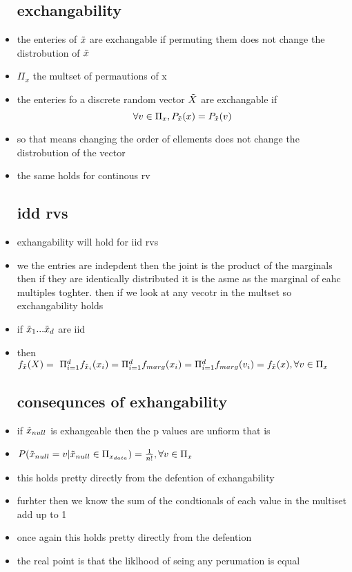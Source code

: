 \documentclass{article}
\begin{document}
\begin{itemize}
\subsection{exchangability}
\item the enteries of $\Tilde{x}$ are exchangable if permuting them does not change the distrobution of $\Tilde{x}$
\item $\Pi_{x}$ the multset of permautions of x 
\item the enteries fo a discrete random vector $\Tilde{X}$ are exchangable if $$\forall v\in \Pi_{x}, P_{\Tilde{x}}(x)=P_{\Tilde{x}}(v)$$
\item so that means changing the order  of ellements does not change the distrobution of the vector
\item the same holds for continous rv
\subsection{idd rvs}
\item exhangability will hold for iid rvs 
\item we the entries are indepdent then the joint is the product of the marginals then if they are identically distributed it is the asme as the marginal of eahc multiples toghter. then if we look at any vecotr in the multset so exchangability holds
\item if $\Tilde{x}_1...\Tilde{x}_{d}$ are iid 
\item then $f_{\tilde{x}}(X)=\ \Pi_{i=1}^{d}f_{\Tilde{x}_i}(x_i)=\Pi_{i=1}^{d}f_{marg}(x_i)=\Pi_{i=1}^{d}f_{marg}(v_i)=f_{\Tilde{x}}(x), \forall v \in \Pi_{x}$
\subsection{consequnces of exhangability}
\item if $\Tilde{x}_{null}$ is exhangeable then the p values are unfiorm that is 
\item $P(\Tilde{x}_{null}=v|\Tilde{x}_{null}\in \Pi_{x_{data}})=\frac{1}{n!}, \forall v \in \Pi_{x} $
\item this holds pretty directly from the defention of exhangability
\item furhter then we know the sum of the condtionals of each value in the multiset  add up to 1 
\item once again this holds pretty directly from the defention
\item the real point is that the liklhood of seing any perumation is equal 


\end{itemize}
\end{document}
